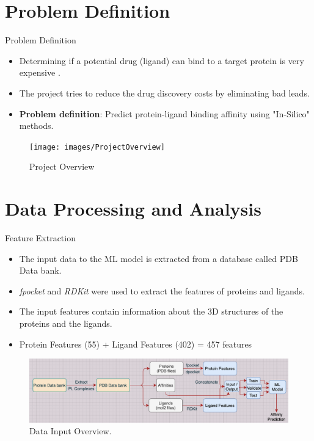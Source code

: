\documentclass{beamer}
\begin{document}
\section{Problem Definition}

\begin{frame}[t]{Problem Definition}

\begin{itemize}
\item Determining if a potential drug (ligand) can bind to a target protein is very expensive \cite{drugdiscoverycost}.
\item The project tries to reduce the drug discovery costs by eliminating bad leads.
\item \textbf{Problem definition}: Predict protein-ligand binding affinity using "In-Silico" methods. 
\end{itemize}

\begin{figure}[htb]
  \centering
    \texttt{[image: images/ProjectOverview]}
    \caption{Project Overview}
    \label{fig:ProjectOverviewImage}
\end{figure}

\end{frame}

\section{Data Processing and Analysis}

\begin{frame}[t]{Feature Extraction}

\begin{itemize}
\item The input data to the ML model is extracted from a database called PDB Data bank.
\item \textit{fpocket} and \textit{RDKit} were used to extract the features of proteins and ligands.
\item The input features contain information about the 3D structures of the proteins and the ligands.
\item Protein Features (55) + Ligand Features (402) = 457 features
\end{itemize}

\begin{figure}[htb]
  \centering
    \includegraphics[scale=0.36]{images/DataInputOverview}
    \caption{Data Input Overview.}
    \label{fig:projectoverviewimage}
\end{figure}


\end{frame}
\end{document}
